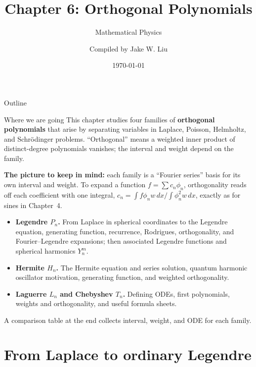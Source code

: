 \documentclass[11pt]{beamer}
\author[]{Compiled by Jake W. Liu}
\title[Orthogonal Polynomials]{Chapter 6: Orthogonal Polynomials}
\subtitle{Mathematical Physics}
\date{\today}
\begin{document}
\setcounter{sfchapter}{6}
\renewcommand{\thesection}{\arabic{sfchapter}.\arabic{section}}

\begin{frame}[c]\titlepage
\end{frame}

\begin{frame}{Outline}
\tableofcontents
\end{frame}

\begin{frame}{Where we are going}
\footnotesize
This chapter studies four families of \textbf{orthogonal polynomials} that arise by
separating variables in Laplace, Poisson, Helmholtz, and Schr\"odinger problems.
``Orthogonal'' means a weighted inner product of distinct-degree polynomials vanishes;
the interval and weight depend on the family.

\smallskip
\textbf{The picture to keep in mind:} each family is a ``Fourier series'' basis for its own
interval and weight. To expand a function $f=\sum c_n\phi_n$, orthogonality reads off each
coefficient with one integral, $c_n=\int f\phi_n w\,dx\big/\!\int\phi_n^2w\,dx$, exactly as
for sines in Chapter~4.
\begin{itemize}
  \item \textbf{Legendre $P_n$.} From Laplace in spherical coordinates to the Legendre
        equation, generating function, recurrence, Rodrigues, orthogonality, and
        Fourier--Legendre expansions; then associated Legendre functions and spherical
        harmonics $Y_n^m$.
  \item \textbf{Hermite $H_n$.} The Hermite equation and series solution, quantum harmonic
        oscillator motivation, generating function, and weighted orthogonality.
  \item \textbf{Laguerre $L_n$ and Chebyshev $T_n$.} Defining ODEs, first polynomials,
        weights and orthogonality, and useful formula sheets.
\end{itemize}
A comparison table at the end collects interval, weight, and ODE for each family.
\end{frame}

\section{From Laplace to ordinary Legendre}
\label{sec:laplace-to-legendre}
\end{document}
